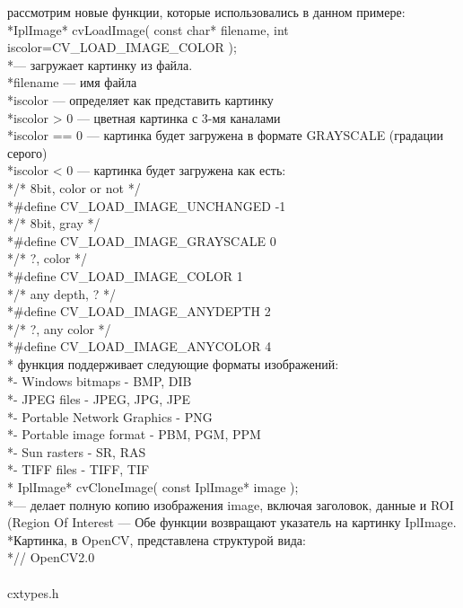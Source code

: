 \documentclass[a4paper,12pt]{article}
\begin{document}
\newline рассмотрим новые функции, которые использовались в данном примере:
\\*IplImage* cvLoadImage( const char* filename, int iscolor=CV\_LOAD\_IMAGE\_COLOR );
\\*— загружает картинку из файла.
\\*filename — имя файла
\\*iscolor — определяет как представить картинку
\\*iscolor > 0 — цветная картинка с 3-мя каналами
\\*iscolor == 0 — картинка будет загружена в формате GRAYSCALE (градации серого)
\\*iscolor < 0 — картинка будет загружена как есть:
\\*/* 8bit, color or not */
\\*\#define CV\_LOAD\_IMAGE\_UNCHANGED  -1
\\*/* 8bit, gray */
\\*\#define CV\_LOAD\_IMAGE\_GRAYSCALE   0
\\*/* ?, color */
\\*\#define CV\_LOAD\_IMAGE\_COLOR       1
\\*/* any depth, ? */
\\*\#define CV\_LOAD\_IMAGE\_ANYDEPTH    2
\\*/* ?, any color */
\\*\#define CV\_LOAD\_IMAGE\_ANYCOLOR    4\\*
функция поддерживает следующие форматы изображений:
\\*- Windows bitmaps - BMP, DIB
\\*- JPEG files - JPEG, JPG, JPE
\\*- Portable Network Graphics - PNG
\\*- Portable image format - PBM, PGM, PPM
\\*- Sun rasters - SR, RAS
\\*- TIFF files - TIFF, TIF\\*
IplImage* cvCloneImage( const IplImage* image );
\\*— делает полную копию изображения image, включая заголовок, данные и ROI (Region Of Interest — %
Обе функции возвращают указатель на картинку IplImage.
\\*Картинка, в OpenCV, представлена структурой вида:
\\*// OpenCV2.0\\\opencv\\cxtypes.h
\end{document}
